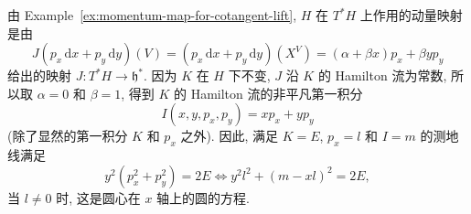 \begin{description}[font=\normalfont,leftmargin=2em,labelwidth=1.5em]
\begin{enumerate}[label=(\alph*),ref=\alph*,leftmargin=*]
\[\]
由 Example~\ref{ex:momentum-map-for-cotangent-lift}, $H$ 在 $T^*H$ 上作用的动量映射是由
\[
 J(p_x\,\mathrm{d}x+p_y\,\mathrm{d}y)(V)
   =(p_x\,\mathrm{d}x+p_y\,\mathrm{d}y)(X^V)
   =(\alpha+\beta x)p_x+\beta yp_y
\]
给出的映射 $J:T^*H\to\mathfrak h^*$. 因为 $K$ 在 $H$ 下不变, $J$ 沿 $K$ 的 Hamilton 流为常数, 所以取 $\alpha=0$ 和 $\beta=1$, 得到 $K$ 的 Hamilton 流的非平凡第一积分
\[
  I(x,y,p_x,p_y)=xp_x+yp_y
\]
(除了显然的第一积分 $K$ 和 $p_x$ 之外). 因此, 满足 $K=E$, $p_x=l$ 和 $I=m$ 的测地线满足
\[
  y^2(p_x^2+p_y^2)=2E\iff y^2l^2+(m-xl)^2=2E,
\]
当 $l\ne0$ 时, 这是圆心在 $x$ 轴上的圆的方程.
\end{enumerate}
\end{description}
